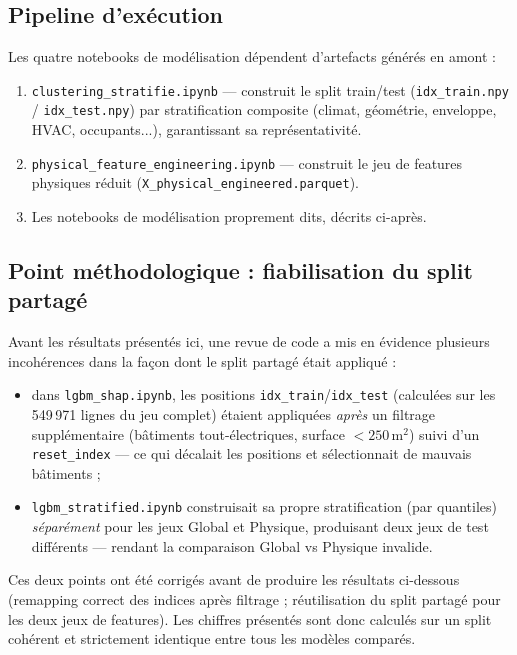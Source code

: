 \documentclass[11pt,a4paper]{article}
\newcommand{\code}[1]{\texttt{#1}}
\begin{document}
\subsection{Pipeline d'exécution}

Les quatre notebooks de modélisation dépendent d'artefacts générés en amont :

\begin{enumerate}
    \item \code{clustering\_stratifie.ipynb} --- construit le split train/test
    (\code{idx\_train.npy} / \code{idx\_test.npy}) par stratification composite (climat,
    géométrie, enveloppe, HVAC, occupants...), garantissant sa représentativité.
    \item \code{physical\_feature\_engineering.ipynb} --- construit le jeu de features physiques
    réduit (\code{X\_physical\_engineered.parquet}).
    \item Les notebooks de modélisation proprement dits, décrits ci-après.
\end{enumerate}

\subsection{Point méthodologique : fiabilisation du split partagé}

Avant les résultats présentés ici, une revue de code a mis en évidence plusieurs incohérences
dans la façon dont le split partagé était appliqué :

\begin{itemize}
    \item dans \code{lgbm\_shap.ipynb}, les positions \code{idx\_train}/\code{idx\_test}
    (calculées sur les 549\,971 lignes du jeu complet) étaient appliquées \emph{après} un
    filtrage supplémentaire (bâtiments tout-électriques, surface $<250\,\text{m}^2$) suivi d'un
    \code{reset\_index} --- ce qui décalait les positions et sélectionnait de mauvais bâtiments ;
    \item \code{lgbm\_stratified.ipynb} construisait sa propre stratification (par quantiles)
    \emph{séparément} pour les jeux Global et Physique, produisant deux jeux de test différents
    --- rendant la comparaison Global vs Physique invalide.
\end{itemize}

Ces deux points ont été corrigés avant de produire les résultats ci-dessous (remapping correct
des indices après filtrage ; réutilisation du split partagé pour les deux jeux de features).
Les chiffres présentés sont donc calculés sur un split cohérent et strictement identique entre
tous les modèles comparés.
\end{document}
